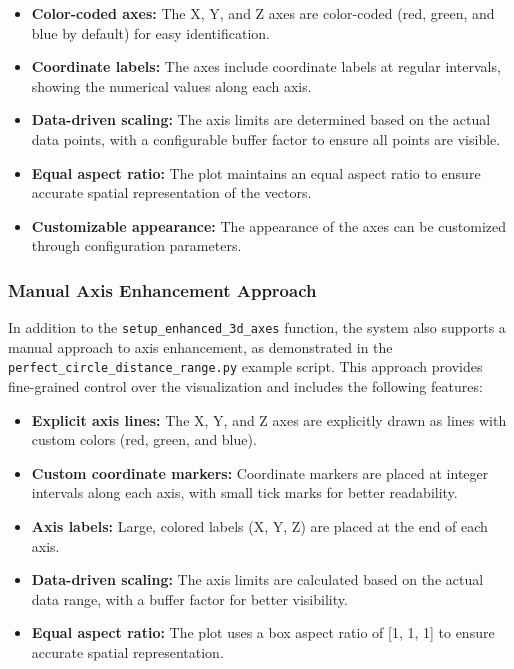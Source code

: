 \begin{itemize}
    \item \textbf{Color-coded axes:} The X, Y, and Z axes are color-coded (red, green, and blue by default) for easy identification.
    \item \textbf{Coordinate labels:} The axes include coordinate labels at regular intervals, showing the numerical values along each axis.
    \item \textbf{Data-driven scaling:} The axis limits are determined based on the actual data points, with a configurable buffer factor to ensure all points are visible.
    \item \textbf{Equal aspect ratio:} The plot maintains an equal aspect ratio to ensure accurate spatial representation of the vectors.
    \item \textbf{Customizable appearance:} The appearance of the axes can be customized through configuration parameters.
\end{itemize}

\subsubsection{Manual Axis Enhancement Approach}

In addition to the \texttt{setup\_enhanced\_3d\_axes} function, the system also supports a manual approach to axis enhancement, as demonstrated in the \texttt{perfect\_circle\_distance\_range.py} example script. This approach provides fine-grained control over the visualization and includes the following features:

\begin{itemize}
    \item \textbf{Explicit axis lines:} The X, Y, and Z axes are explicitly drawn as lines with custom colors (red, green, and blue).
    \item \textbf{Custom coordinate markers:} Coordinate markers are placed at integer intervals along each axis, with small tick marks for better readability.
    \item \textbf{Axis labels:} Large, colored labels (X, Y, Z) are placed at the end of each axis.
    \item \textbf{Data-driven scaling:} The axis limits are calculated based on the actual data range, with a buffer factor for better visibility.
    \item \textbf{Equal aspect ratio:} The plot uses a box aspect ratio of [1, 1, 1] to ensure accurate spatial representation.
\end{itemize}

